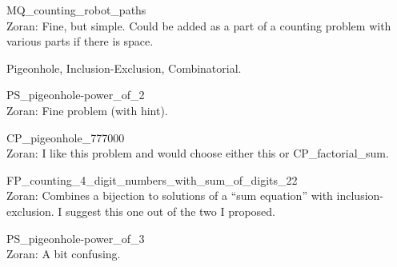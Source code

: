 \documentclass[quiz]{mcs}
\begin{document}
\begin{staffnotes}
MQ\_counting\_robot\_paths\\
Zoran: Fine, but simple. Could be added as a part of a counting problem with various parts
if there is space.
\end{staffnotes}






\begin{staffnotes}
\begin{center}
{\large Pigeonhole, Inclusion-Exclusion, Combinatorial.}
\end{center}
\end{staffnotes}

\examspace
\begin{staffnotes}
PS\_pigeonhole-power\_of\_2\\
Zoran: Fine problem (with hint).
\end{staffnotes}

\begin{staffnotes}
CP\_pigeonhole\_777000\\
Zoran: I like this problem and would choose either this or CP\_factorial\_sum.
\end{staffnotes}

\examspace
\begin{staffnotes}
FP\_counting\_4\_digit\_numbers\_with\_sum\_of\_digits\_22\\
Zoran: Combines a bijection to solutions of a ``sum equation'' with inclusion-exclusion.
I suggest this one out of the two I proposed.
\end{staffnotes}

\begin{staffnotes}
PS\_pigeonhole-power\_of\_3\\
Zoran: A bit confusing.
\end{staffnotes}
\end{document}
